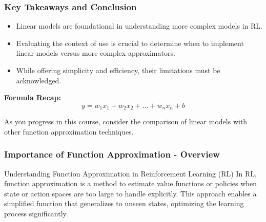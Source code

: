 \documentclass[aspectratio=169]{beamer}
\begin{document}
\begin{frame}[fragile]
    \frametitle{Key Takeaways and Conclusion}
    \begin{itemize}
        \item Linear models are foundational in understanding more complex models in RL.
        \item Evaluating the context of use is crucial to determine when to implement linear models versus more complex approximators.
        \item While offering simplicity and efficiency, their limitations must be acknowledged.
    \end{itemize}
    
    \bigskip
    
    \textbf{Formula Recap:}
    \begin{equation}
        y = w_1 x_1 + w_2 x_2 + \ldots + w_n x_n + b
    \end{equation}
    
    \bigskip
    
    As you progress in this course, consider the comparison of linear models with other function approximation techniques.
\end{frame}

\begin{frame}[fragile]
    \frametitle{Importance of Function Approximation - Overview}
    \begin{block}{Understanding Function Approximation in Reinforcement Learning (RL)}
        In RL, function approximation is a method to estimate value functions or policies when state or action spaces are too large to handle explicitly. This approach enables a simplified function that generalizes to unseen states, optimizing the learning process significantly.
    \end{block}
\end{frame}
\end{document}
